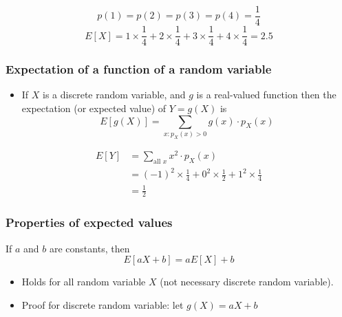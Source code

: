 \documentclass[slidestop,compress,mathserif]{beamer}
\begin{document}
\begin{frame}

\pause
\[ p(1) = p(2) = p(3) = p(4) = \frac{1}{4} \]
\[ E[X] = 1\times \frac{1}{4} + 2\times \frac{1}{4} + 3\times \frac{1}{4} + 4\times \frac{1}{4} = 2.5 \]


\end{frame}



\begin{frame}\frametitle{Expectation of a function of a random variable}
\begin{itemize}
\item If $X$ is a discrete random variable, and $g$ is a real-valued function then the expectation (or expected value) of $Y = g(X)$ is
\[ E[g(X)] = \sum_{x: p_X(x) > 0} g(x) \cdot p_X(x) \]
\end{itemize}


\end{frame}

\begin{frame}

\pause
\begin{align*}
E[Y] & = \sum_{\text{all }x} x^2 \cdot p_X(x)\\
& = (-1)^2 \times \frac{1}{4} + 0^2 \times \frac{1}{2} + 1^2 \times \frac{1}{4}\\
& = \frac{1}{2}
\end{align*}


\end{frame}


\begin{frame}
\frametitle{Properties of expected values}

If $a$ and $b$ are constants, then
\[ E[aX+b] = a E[X] + b \]


\begin{itemize}
\item Holds for all random variable $X$ (not necessary discrete random variable).
\pause \vspace{2mm}
\item Proof for discrete random variable: let $g(X) = aX + b$
\end{itemize}

\end{frame}
\end{document}
